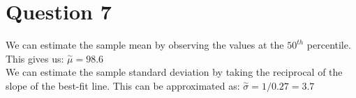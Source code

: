 \documentclass{article}
\begin{document}
\section*{Question 7}
We can estimate the sample mean by observing the values at the $50^{th}$ percentile. This gives us:
$\stackrel{\sim}{\mu}= 98.6$\\
We can estimate the sample standard deviation by taking the reciprocal of the slope of the best-fit line.
This can be approximated as:
$\stackrel{\sim}{\sigma} = 1/0.27 = 3.7$\\
\end{document}
